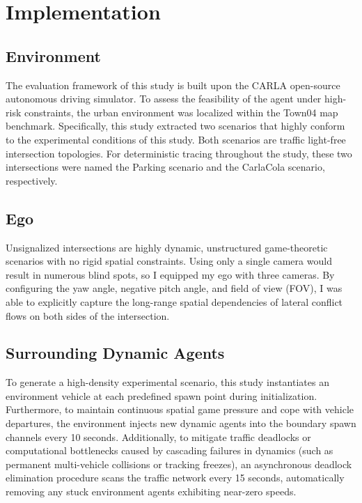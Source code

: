 
\section{Implementation}
    \subsection{Environment}
    The evaluation framework of this study is built upon the CARLA open-source autonomous driving simulator. To assess the feasibility of the agent under high-risk constraints, the urban environment was localized within the Town04 map benchmark. Specifically, this study extracted two scenarios that highly conform to the experimental conditions of this study. Both scenarios are traffic light-free intersection topologies. For deterministic tracing throughout the study, these two intersections were named the Parking scenario and the CarlaCola scenario, respectively.
    
    \subsection{Ego}
    Unsignalized intersections are highly dynamic, unstructured game-theoretic scenarios with no rigid spatial constraints. Using only a single camera would result in numerous blind spots, so I equipped my ego with three cameras. By configuring the yaw angle, negative pitch angle, and field of view (FOV), I was able to explicitly capture the long-range spatial dependencies of lateral conflict flows on both sides of the intersection.
    
    \subsection{Surrounding Dynamic Agents}
    To generate a high-density experimental scenario, this study instantiates an environment vehicle at each predefined spawn point during initialization. Furthermore, to maintain continuous spatial game pressure and cope with vehicle departures, the environment injects new dynamic agents into the boundary spawn channels every 10 seconds. Additionally, to mitigate traffic deadlocks or computational bottlenecks caused by cascading failures in dynamics (such as permanent multi-vehicle collisions or tracking freezes), an asynchronous deadlock elimination procedure scans the traffic network every 15 seconds, automatically removing any stuck environment agents exhibiting near-zero speeds.

